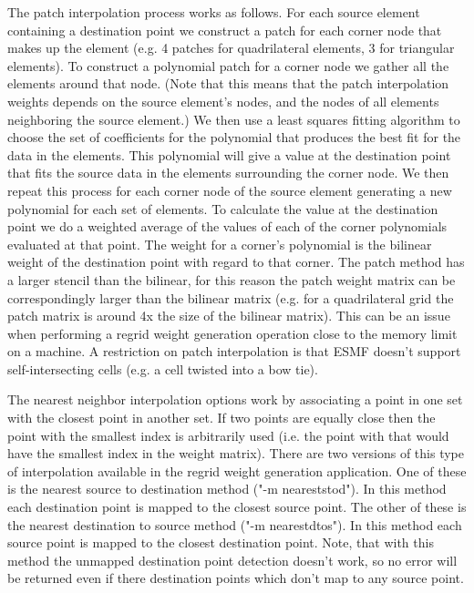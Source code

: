The patch interpolation process works as follows.
For each source element containing a destination point
we construct a patch for each corner node that makes up the element (e.g. 4 patches for
quadrilateral elements, 3 for triangular elements). To construct a polynomial patch for
  a corner node we gather all the elements around that node.
(Note that this means that the patch interpolation weights depends on the source
element's nodes, and the nodes of all elements neighboring the source element.)
We then use a least squares fitting algorithm to choose the set of coefficients
for the polynomial that produces the best fit for the data in the elements.
This polynomial will give a value at the destination point that fits the source data
in the elements surrounding the corner node. We then repeat this process for each
corner node of the source element generating a new polynomial for each set of elements.
To calculate the value at the destination point we do a weighted average of the values
of each of the corner polynomials evaluated at that point. The weight for a corner's
polynomial is the bilinear weight of the destination point with regard to that corner.
The patch method has a larger stencil than the bilinear, for this reason the patch weight matrix can be correspondingly larger
than the bilinear matrix (e.g. for a quadrilateral grid the patch matrix is around 4x the size of
the bilinear matrix). This can be an issue when performing a regrid weight generation operation close to the memory
limit on a machine. A restriction on patch interpolation is that ESMF doesn't support self-intersecting cells (e.g. a cell twisted into a 
bow tie). 

The nearest neighbor interpolation options work by associating a point in one set with the closest point in another set. If two points are equally
close then the point with the smallest index is arbitrarily used (i.e. the point with that would have the smallest index in the weight matrix). There are two
versions of this type of interpolation available in the regrid weight generation application. One of these is the nearest source to destination
method ("-m neareststod"). In this method each destination point is mapped to the closest source point. The other of these is the
nearest destination to source method ("-m nearestdtos"). In this method each source point is mapped to the closest destination point. Note,
that with this method the unmapped destination point detection doesn't work, so no error will be returned even if there destination points
which don't map to any source point.

